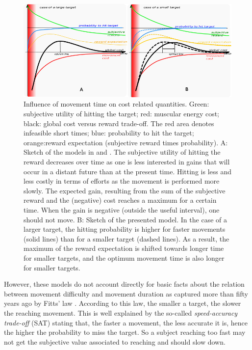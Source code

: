 \documentclass[pdftex,a4paper,11pt]{report}
\begin{document}
\begin{figure}[hbt]
\centering
	\includegraphics[width=1.0\columnwidth]{images/canu_fig3T.png}
\caption{Influence of movement time on cost related quantities.
Green: subjective utility of hitting the target; red: muscular energy cost; black: global cost versus reward trade-off. The red area denotes infeasible short times; blue: probability to hit the target; orange:reward expectation (subjective reward times probability).
 A: Sketch of the models in \cite{shadmehr10} and \cite{rigoux12_plos}.
The subjective utility of hitting the reward decreases over time as one is less interested in gains that will occur in a distant future than at the present time. Hitting is less and less costly in terms of efforts as the movement is performed more slowly.
The expected gain, resulting from the sum of the subjective reward and the (negative) cost reaches a maximum for a certain time. When the gain is negative (outside the useful interval), one should not move.
B: Sketch of the presented model.
In the case of a larger target, the hitting probability is higher for faster movements (solid lines) than for a smaller target (dashed lines). As a result, the maximum of the reward expectation is shifted towards longer time for smaller targets, and the optimum movement time is also longer for smaller targets.\label{fig:mvt_acc}}
\end{figure}

However, these models do not account directly for basic facts about the relation between movement difficulty and movement duration as captured more than fifty years ago by Fitts' law \cite{fitts54_JEP}.
According to this law, the smaller a target, the slower the reaching movement. 
This is well explained by the so-called {\em speed-accuracy trade-off} (SAT) stating that, the faster a movement, the less accurate it is, hence the higher the probability to miss the target. So a subject reaching too fast may not get the subjective value associated to reaching and should slow down.
\end{document}
